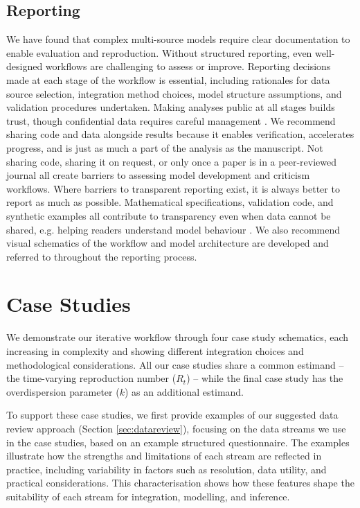 \documentclass{article}
\begin{document}
\subsection{Reporting} \label{sec:reporting}
We have found that complex multi-source models require clear documentation to enable evaluation and reproduction.
Without structured reporting, even well-designed workflows are challenging to assess or improve.
Reporting decisions made at each stage of the workflow is essential, including rationales for data source selection, integration method choices, model structure assumptions, and validation procedures undertaken.
Making analyses public at all stages builds trust, though confidential data requires careful management \citep{Abbott2021-delta, Abbott2022-prevalence}. 
We recommend sharing code and data alongside results because it enables verification, accelerates progress, and is just as much a part of the analysis as the manuscript.
Not sharing code, sharing it on request, or only once a paper is in a peer-reviewed journal all create barriers to assessing model development and criticism workflows.
Where barriers to transparent reporting exist, it is always better to report as much as possible.
Mathematical specifications, validation code, and synthetic examples all contribute to transparency even when data cannot be shared, e.g. helping readers understand model behaviour \citep{Mellor2025-norovirus}.
We also recommend visual schematics of the workflow and model architecture are developed and referred to throughout the reporting process.

\section{Case Studies}

We demonstrate our iterative workflow through four case study schematics, each increasing in complexity and showing different integration choices and methodological considerations. All our case studies share a common estimand -- the time-varying reproduction number ($R_t$) -- while the final case study has the overdispersion parameter ($k$) as an additional estimand.

To support these case studies, we first provide examples of our suggested data review approach (Section \ref{sec:datareview}), focusing on the data streams we use in the case studies, based on an example structured questionnaire.
The examples illustrate how the strengths and limitations of each stream are reflected in practice, including variability in factors such as resolution, data utility, and practical considerations. This characterisation shows how these features shape the suitability of each stream for integration, modelling, and inference.
\end{document}
